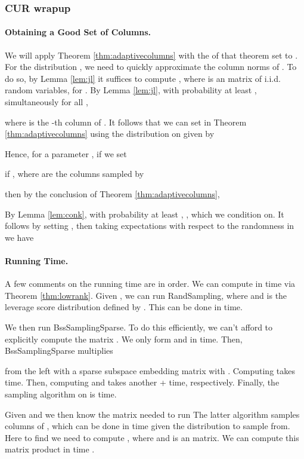 \documentclass[11pt]{article}
\begin{document}
\subsubsection{CUR wrapup}\label{sec:CURWrapup}
\paragraph{Obtaining a Good Set of Columns.}
We will apply 
Theorem \ref{thm:adaptivecolumns} with the  
of that theorem set to . For the distribution , we need
to quickly approximate the column norms of 
. To do so, 
by Lemma \ref{lem:jl}
it suffices
to compute , where  is an 
matrix of i.i.d.  random variables, for . By
Lemma \ref{lem:jl}, with probability at least , simultaneously
for all , 

where  is the -th column of . It follows that we
can set  in Theorem \ref{thm:adaptivecolumns} using
the distribution  on  given by

Hence, for a parameter , if we set

if , where  are the columns sampled by 

then by the conclusion of Theorem \ref{thm:adaptivecolumns}, 

By Lemma \ref{lem:conk}, with probability at least , 
, 
which we condition on. It follows by setting , then 
taking expectations with respect to the randomness
in  we have


\paragraph{Running Time.}
A few comments on the running time are in order. We can compute  in
 time via Theorem \ref{thm:lowrank}. Given , we
can run {\textsc RandSampling}, where  and  is the leverage
score distribution defined by . This can be done in  time. 

We then run 
{\textsc BssSamplingSparse}.
To do this efficiently, we can't afford to explicitly compute the matrix
. 
We only form   and  in  time. 
Then, {\textsc BssSamplingSparse} multiplies 

from the left with a sparse subspace embedding matrix  with 
. Computing  takes  time.
Then, computing  and  takes another 
 +  time, respectively. Finally, the sampling algorithm on
 is  time.

Given  and  we then know the matrix  needed to run
 The latter algorithm samples columns of ,
which can be done in  time given the distribution  to sample from. Here to find
 we need to compute , where  and  is 
an  matrix. We can compute this matrix product in time . 
\end{document}
